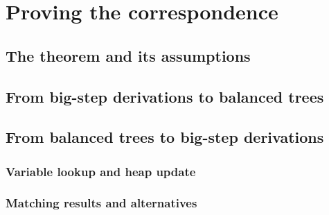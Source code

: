\chapter{Proving the correspondence}
\label{chap:proof}

\section{The theorem and its assumptions}

\section{From big-step derivations to balanced trees}

\section{From balanced trees to big-step derivations}

\subsection{Variable lookup and heap update}

\subsection{Matching results and alternatives}

